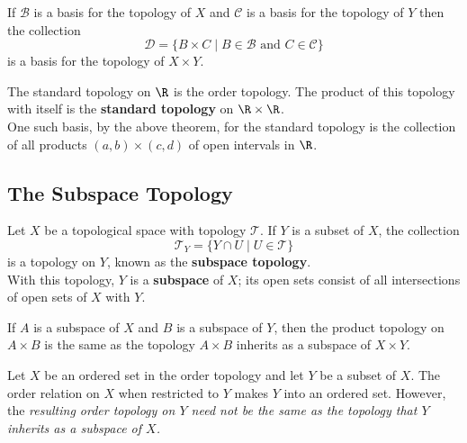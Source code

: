 \begin{theorem}
If $\mathscr{B}$ is a basis for the topology of $X$ and $\mathscr{C}$ is a basis for the topology of $Y$ then the collection
\[
    \mathscr{D} = \{ B \times C \mid B \in \mathscr{B} \text{ and } C \in \mathscr{C} \} 
\]
is a basis for the topology of $X \times Y$.
\end{theorem}

\begin{eg}
The standard topology on $\R$ is the order topology. The product of this topology with itself is the \textbf{standard topology} on $\R \times \R$. \\

One such basis, by the above theorem, for the standard topology is the collection of all products $(a, b) \times (c, d)$ of open intervals in $\R$.
\end{eg}

\subsection{The Subspace Topology}

\begin{definition}
Let $X$ be a topological space with topology $\mathscr{T}$. If $Y$ is a subset of $X$, the collection
\[
    \mathscr{T}_Y = \{ Y \cap U \mid U \in \mathscr{T} \} 
\]
is a topology on $Y$, known as the \textbf{subspace topology}. \\

With this topology, $Y$ is a \textbf{subspace} of $X$; its open sets consist of all intersections of open sets of $X$ with $Y$.
\end{definition}

\begin{theorem}
If $A$ is a subspace of $X$ and $B$ is a subspace of $Y$, then the product topology on $A \times B$ is the same as the topology $A \times B$ inherits as a subspace of $X \times Y$.
\end{theorem}

\begin{remark}
Let $X$ be an ordered set in the order topology and let $Y$ be a subset of $X$. The order relation on $X$ when restricted to $Y$ makes $Y$ into an ordered set.
However, the \textit{resulting order topology on $Y$ need not be the same as the topology that $Y$ inherits as a subspace of $X$.}
\end{remark}

